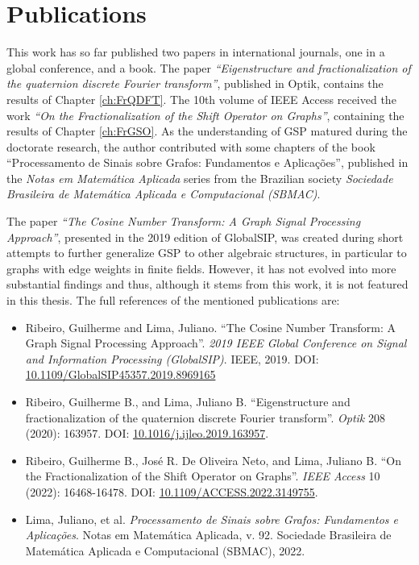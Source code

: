 \section{Publications}

This work has so far published two papers in international journals, one in a global conference, and a book. The paper \textit{``Eigenstructure and fractionalization of the quaternion discrete Fourier transform''}, published in Optik, contains the results of Chapter \ref{ch:FrQDFT}. The 10th volume of IEEE Access received the work \textit{``On the Fractionalization of the Shift Operator on Graphs''}, containing the results of Chapter \ref{ch:FrGSO}. As the understanding of GSP matured during the doctorate research, the author contributed with some chapters of the book ``Processamento de Sinais sobre Grafos: Fundamentos e Aplica{\c c}{\~o}es'', published in the \textit{Notas em Matem\'atica Aplicada} series from the Brazilian society \textit{Sociedade Brasileira de Matemática Aplicada e Computacional (SBMAC)}.

The paper \emph{``The Cosine Number Transform: A Graph Signal Processing Approach''}, presented in the 2019 edition of GlobalSIP, was created during short attempts to further generalize GSP to other algebraic structures, in particular to graphs with edge weights in finite fields. However, it has not evolved into more substantial findings and thus, although it stems from this work, it is not featured in this thesis. The full references of the mentioned publications are:

\begin{itemize}[noitemsep]
\item Ribeiro, Guilherme and Lima, Juliano. ``The Cosine Number Transform: A Graph Signal Processing Approach''. \textit{2019 IEEE Global Conference on Signal and Information Processing (GlobalSIP)}. IEEE, 2019. DOI: \href{https://doi.org/10.1109/GlobalSIP45357.2019.8969165}{10.1109/GlobalSIP45357.2019.8969165}

\item Ribeiro, Guilherme B., and Lima, Juliano B. ``Eigenstructure and fractionalization of the quaternion discrete Fourier transform''. \textit{Optik} 208 (2020): 163957. DOI: \href{https://doi.org/10.1016/j.ijleo.2019.163957}{10.1016/j.ijleo.2019.163957}.

\item Ribeiro, Guilherme B., José R. De Oliveira Neto, and Lima, Juliano B. ``On the Fractionalization of the Shift Operator on Graphs''. \textit{IEEE Access} 10 (2022): 16468-16478. DOI: \href{https://doi.org/10.1109/ACCESS.2022.3149755}{10.1109/ACCESS.2022.3149755}.

\item Lima, Juliano, et al. \textit{Processamento de Sinais sobre Grafos: Fundamentos e Aplica{\c c}{\~o}es}. Notas em Matem\'atica Aplicada, v. 92. Sociedade Brasileira de Matemática Aplicada e Computacional (SBMAC), 2022.
\end{itemize}

